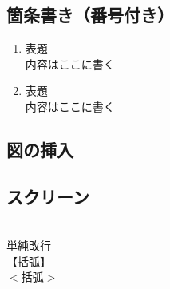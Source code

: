 \documentclass[a4j]{jarticle}
\begin{document}
\subsection{箇条書き（番号付き）}
\begin{enumerate}
\item 表題　~\\
内容はここに書く 
\item 表題　\mbox{}\\
内容はここに書く 
\end{enumerate}

\subsection{図の挿入}

\subsection{スクリーン}
\begin{screen}
~\\
単純改行\\
$【括弧】$\\
$<括弧>$ \\
\end{screen}
\end{document}
